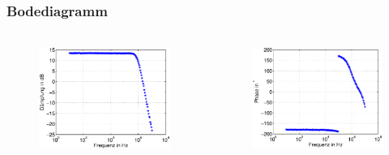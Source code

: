 \begin{frame}
\frametitle{Bodediagramm}
\framesubtitle{}
    \begin{columns}[c]
        \begin{figure}[H]
        \begin{center}
                \includegraphics[scale=0.4]{./img/plots/Auf_2_bode_db.eps}
        \end{center}
        \end{figure}
        \begin{figure}[H]
        \begin{center}
                \includegraphics[scale=0.4]{./img/plots/Auf_2_bode_ph.eps}

\end{center}
\end{figure}
\end{columns}
\end{frame}
